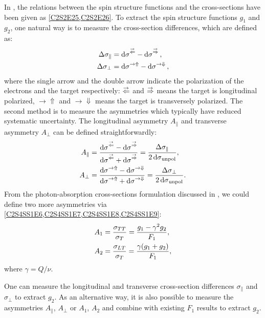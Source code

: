 In , the relations between the spin structure functions and the cross-sections have been given as \cref{C2S2E25,C2S2E26}. To extract the spin structure functions $g_1$ and $g_2$, one natural way is to measure the cross-section differences, which are defined as:
\begin{align} \label{C4S1E1}
\Delta\sigma_{\parallel} & = \dd{\sigma}^{\buildrel\rightarrow\over\Leftarrow}-\dd{\sigma}^{\buildrel\rightarrow\over\Rightarrow}, \\ \label{C4S1E2}
\Delta\sigma_{\perp} & = \dd{\sigma}^{\rightarrow\Uparrow}-\dd{\sigma}^{\rightarrow\Downarrow},
\end{align}
where the single arrow and the double arrow indicate the polarization of the electrons and the target respectively: $\buildrel\rightarrow\over\Leftarrow$ and $\buildrel\rightarrow\over\Rightarrow$ means the target is longitudinal polarized, $\rightarrow\Uparrow$ and $\rightarrow\Downarrow$ means the target is transversely polarized. The second method is to measure the asymmetries which typically have reduced systematic uncertainty. The longitudinal asymmetry $A_{\parallel}$ and transverse asymmetry $A_{\perp}$ can be defined straightforwardly:
\begin{align} \label{C4S1E3}
A_{\parallel} & = \frac{\dd{\sigma}^{\buildrel\rightarrow\over\Leftarrow}-\dd{\sigma}^{\buildrel\rightarrow\over\Rightarrow}}{\dd{\sigma}^{\buildrel\rightarrow\over\Leftarrow}+\dd{\sigma}^{\buildrel\rightarrow\over\Rightarrow}} = \frac{\Delta\sigma_{\parallel}}{2\dd{\sigma}_{\mathrm{unpol}}}, \\ \label{C4S1E4}
A_{\perp} & = \frac{\dd{\sigma}^{\rightarrow\Uparrow}-\dd{\sigma}^{\rightarrow\Downarrow}}{\dd{\sigma}^{\rightarrow\Uparrow}+\dd{\sigma}^{\rightarrow\Downarrow}} = \frac{\Delta\sigma_{\perp}}{2\dd{\sigma}_{\mathrm{unpol}}}.
\end{align}
From the photon-absorption cross-sections formulation discussed in , we could define two more asymmetries via \cref{C2S4SS1E6,C2S4SS1E7,C2S4SS1E8,C2S4SS1E9}:
\begin{align} \label{C4S1E5}
A_1 & = \frac{\sigma_{TT}}{\sigma_{T}} = \frac{g_1-\gamma^2g_2}{F_1}, \\ \label{C4S1E6}
A_2 & = \frac{\sigma_{LT}}{\sigma_{T}} = \frac{\gamma(g_1+g_2)}{F_1},
\end{align}
where $\gamma=Q/\nu$.

One can measure the longitudinal and transverse cross-section differences $\sigma_\parallel$ and $\sigma_\perp$ to extract $g_2$. As an alternative way, it is also possible to measure the asymmetries $A_\parallel$, $A_\perp$ or $A_1$, $A_2$ and combine with existing $F_1$ results to extract $g_2$.

